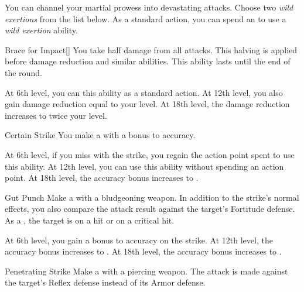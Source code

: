         You can channel your martial prowess into devastating attacks.
        Choose two \textit{wild exertions} from the list below.
        As a standard action, you can spend an  to use a \textit{wild exertion} ability.
        {
            \begin{ability}{Brace for Impact}[]
                You take half damage from all attacks.
                This halving is applied before damage reduction and similar abilities.
                This ability lasts until the end of the round.

                At 6th level, you can  this ability as a standard action.
                At 12th level, you also gain damage reduction equal to your level.
                At 18th level, the damage reduction increases to twice your level.
            \end{ability}

            \begin{ability}{Certain Strike}
                You make a  with a  bonus to accuracy.

                At 6th level, if you miss with the strike, you regain the action point spent to use this ability.
                At 12th level, you can use this ability without spending an action point.
                At 18th level, the accuracy bonus increases to .
            \end{ability}

            \begin{ability}{Gut Punch}
                Make a  with a bludgeoning weapon.
                In addition to the strike's normal effects, you also compare the attack result against the target's Fortitude defense.
                As a , the target is \sickened on a hit or \nauseated on a critical hit.

                At 6th level, you gain a  bonus to accuracy on the strike.
                At 12th level, the accuracy bonus increases to .
                At 18th level, the accuracy bonus increases to .
            \end{ability}

            \begin{ability}{Penetrating Strike}
                Make a  with a piercing weapon.
                The attack is made against the target's Reflex defense instead of its Armor defense.


\end{ability}}
